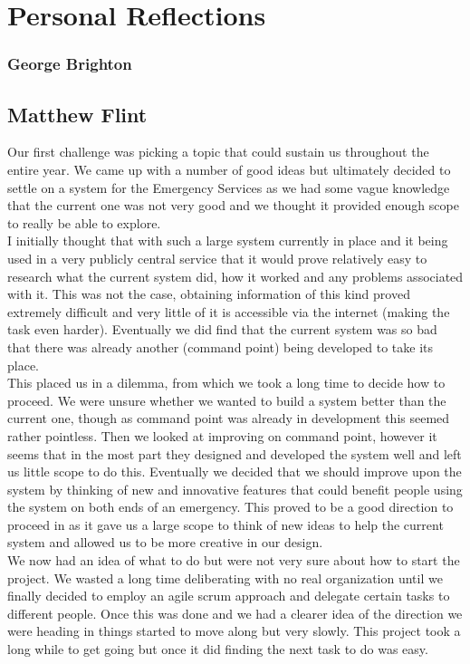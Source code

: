 \documentclass[]{article}
\begin{document}
\pagebreak
    \section{Personal Reflections}
    \pagebreak
    \subsubsection{George Brighton}
    \pagebreak
    \subsection{Matthew Flint}
    Our first challenge was picking a topic that could sustain us throughout the entire year. We came up with a number of good ideas but ultimately decided to settle on a system for the Emergency Services as we had some vague knowledge that the current one was not very good and we thought it provided enough scope to really be able to explore.\\

I initially thought that with such a large system currently in place and it being used in a very publicly central service that it would prove relatively easy to research what the current system did, how it worked and any problems associated with it. This was not the case, obtaining information of this kind proved extremely difficult and very little of it is accessible via the internet (making the task even harder). Eventually we did find that the current system was so bad that there was already another (command point) being developed to take its place.\\

This placed us in a dilemma, from which we took a long time to decide how to proceed. We were unsure whether we wanted to build a system better than the current one, though as command point was already in development this seemed rather pointless. Then we looked at improving on command point, however it seems that in the most part they designed and developed the system well and left us little scope to do this. Eventually we decided that we should improve upon the system by thinking of new and innovative features that could benefit people using the system on both ends of an emergency. This proved to be a good direction to proceed in as it gave us a large scope to think of new ideas to help the current system and allowed us to be more creative in our design.\\

We now had an idea of what to do but were not very sure about how to start the project. We wasted a long time deliberating with no real organization until we finally decided to employ an agile scrum approach and delegate certain tasks to different people. Once this was done and we had a clearer idea of the direction we were heading in things started to move along but very slowly. This project took a long while to get going but once it did finding the next task to do was easy.\
\end{document}
